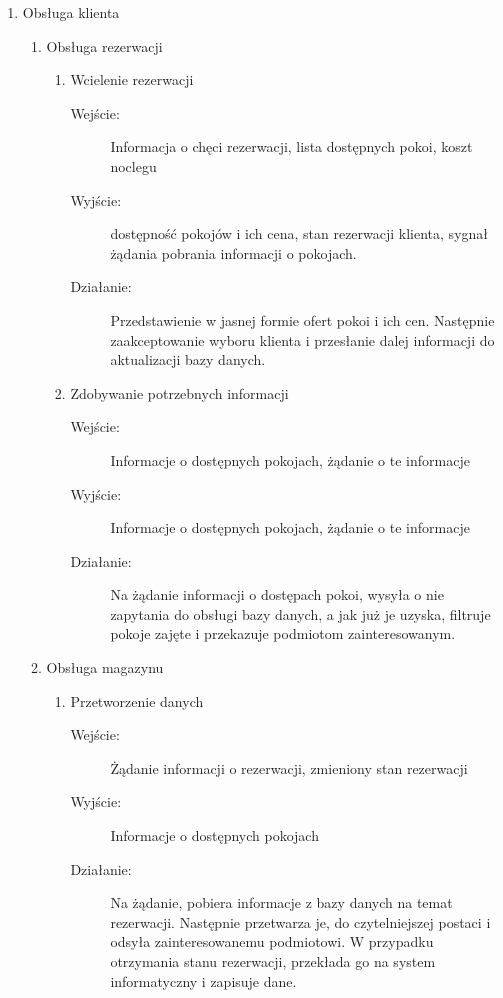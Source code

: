 \documentclass[a4paper, 11pt]{article}
\begin{document}
\begin{enumerate}[label*=\arabic*.]
\begin{enumerate}[label*=\arabic*.]
\begin{description}
			\end{description}	
		\end{enumerate}
		\item Obsługa klienta
		\begin{enumerate}[label*=\arabic*.]
			\item Obsługa rezerwacji
			\begin{enumerate}[label*=\arabic*.]
				\item Wcielenie rezerwacji
				\begin{description}
					\item[Wejście:] Informacja o chęci rezerwacji, lista dostępnych pokoi, koszt noclegu
					\item[Wyjście:] dostępność pokojów i ich cena, stan rezerwacji klienta, sygnał żądania pobrania informacji o pokojach.
					\item[Działanie:] Przedstawienie w jasnej formie ofert pokoi i ich cen. Następnie zaakceptowanie wyboru klienta i przesłanie dalej informacji do aktualizacji bazy danych.
				\end{description}	
				\item Zdobywanie potrzebnych informacji
				\begin{description}
					\item[Wejście:] Informacje o dostępnych pokojach, żądanie o te informacje
					\item[Wyjście:] Informacje o dostępnych pokojach, żądanie o te informacje
					\item[Działanie:] Na żądanie informacji o dostępach pokoi, wysyła o nie zapytania do obsługi bazy danych, a jak już je uzyska, filtruje pokoje zajęte i przekazuje podmiotom zainteresowanym.
				\end{description}	
			\end{enumerate}
			\item Obsługa magazynu
			\begin{enumerate}[label*=\arabic*.]
				\item Przetworzenie danych
				\begin{description}
					\item[Wejście:] Żądanie informacji o rezerwacji, zmieniony stan rezerwacji
					\item[Wyjście:] Informacje o dostępnych pokojach
					\item[Działanie:] Na żądanie, pobiera informacje z bazy danych na temat rezerwacji. Następnie przetwarza je, do czytelniejszej postaci i odsyła zainteresowanemu podmiotowi. W przypadku otrzymania stanu rezerwacji, przekłada go na  system informatyczny i zapisuje dane.

\end{description}
\end{enumerate}
\end{enumerate}
\end{enumerate}
\end{document}
